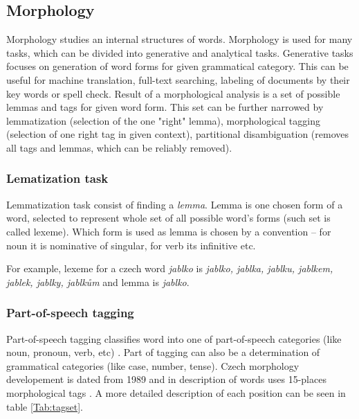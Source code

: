

\subsection{Morphology}
Morphology studies an internal structures of words.
Morphology is used for many tasks, which can be divided into generative and analytical tasks. Generative tasks focuses on generation of word forms for given grammatical category. This can be useful for machine translation, full-text searching, labeling of documents by their key words or spell check. Result of a morphological analysis is a set of possible lemmas and tags for given word form. This set can be further narrowed by lemmatization (selection of the one "right" lemma), morphological tagging (selection of one right tag in given context), partitional disambiguation (removes all tags and lemmas, which can be reliably removed).

\par
\subsubsection{Lematization task}
Lemmatization task consist of finding a \textit{lemma}. Lemma is one chosen form of a word, selected to represent whole set of all possible word's forms (such set is called lexeme).  Which form is used as lemma is chosen by a convention -- for noun it is nominative of singular, for verb its infinitive etc.
\par
For example, lexeme for a czech word \textit{jablko} is \textit{jablko, jablka, jablku,  jablkem, jablek, jablky, jablkům} and lemma is \textit{jablko}.

\subsubsection{Part-of-speech tagging} 
Part-of-speech tagging classifies word into one of part-of-speech categories (like noun, pronoun, verb, etc) \citep{Hladka}. Part of tagging can also be a determination of grammatical categories (like case, number, tense). %
Czech morphology developement is dated from 1989 %
and in description of words uses 15-places morphological tags \citep{Hana2005}.
A more detailed description of each position can be seen in table \ref{Tab:tagset}.

